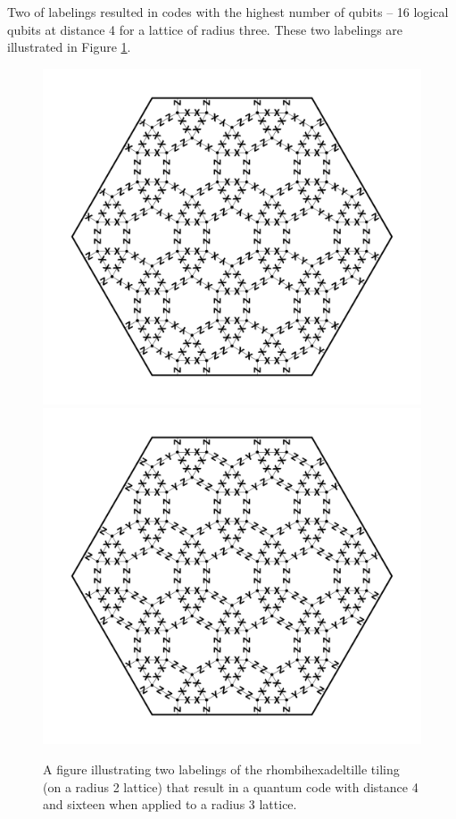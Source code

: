 \documentclass{amsbook}
\theoremstyle{plain}
\theoremstyle{definition}
\theoremstyle{remark}
\begin{document}
Two of labelings resulted in codes with the highest number of qubits -- 16 logical qubits at distance 4 for a lattice of radius three.  These two labelings are illustrated in Figure \ref{figure:rhombihexadeltille-code-4-labelings}.



\begin{figure}
\includegraphics[width=4.75in]{images/rhombihexadeltille-code-4-labeling-1} %
\\
\includegraphics[width=4.75in]{images/rhombihexadeltille-code-4-labeling-2} %
\caption{
\label{figure:rhombihexadeltille-code-4-labelings}
A figure illustrating two labelings of the rhombihexadeltille tiling (on a radius 2 lattice) that result in a quantum code with distance 4 and sixteen when applied to a radius 3 lattice.
}
\end{figure}
\end{document}
